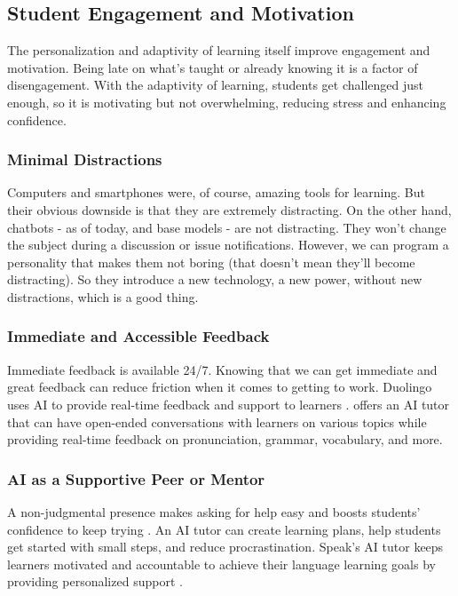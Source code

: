 \documentclass{article}
\begin{document}
\subsection{Student Engagement and Motivation}

The personalization and adaptivity of learning itself
improve engagement and motivation. Being late on what's
taught or already knowing it is a factor of disengagement.
With the adaptivity of learning, students get challenged just enough,
so it is motivating but not overwhelming, reducing stress and enhancing confidence.

\subsubsection{Minimal Distractions}

Computers and smartphones were, of course, amazing tools for learning.
But their obvious downside is that they are extremely distracting.
On the other hand, chatbots - as of today, and base models - are not distracting.
They won't change the subject during a discussion or issue notifications.
However, we can program a personality that makes them not boring
(that doesn't mean they'll become distracting). So they introduce a new technology, a new power, without new distractions, which is a good thing.

\subsubsection{Immediate and Accessible Feedback}

Immediate feedback is available 24/7.
Knowing that we can get immediate and great feedback
can reduce friction when it comes to getting to work.
Duolingo uses AI to provide real-time feedback and support
to learners \cite{forbes_duolingo_ai}. \cite[Speak]{speak} offers an AI
tutor that can have open-ended conversations with
learners on various topics while providing real-time
feedback on pronunciation, grammar, vocabulary,
and more.

\subsubsection{AI as a Supportive Peer or Mentor}

A non-judgmental presence makes asking for help easy and
boosts students' confidence to keep trying
\cite{springer_ai_education}.
An AI tutor can create learning plans,
help students get started with small steps,
and reduce procrastination. Speak's AI tutor keeps
learners motivated and accountable to achieve their
language learning goals by providing personalized support
\cite{speak}.
\end{document}
